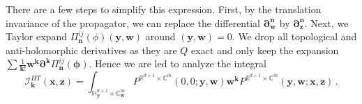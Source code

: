 \documentclass[11pt]{article}
\newcommand{\C}{\mathbb{C}}
\newcommand{\R}{\mathbb{R}}
\numberwithin{equation}{section}
\begin{document}
There are a few steps to simplify this expression. First, by the translation invariance of the propagator, we can replace the differential $\boldsymbol{\partial}^{\boldsymbol{n}}_{\boldsymbol{w}}$ by $\boldsymbol{\partial}^{\boldsymbol{n}}_{\boldsymbol{z}}$. Next, we Taylor expand $\Pi^{ij}_{\boldsymbol{n}}(\phi)(\boldsymbol{y},\boldsymbol{w})$ around $(\boldsymbol{y},\boldsymbol{w})= 0$. We drop all topological and anti-holomorphic derivatives as they are $Q$ exact and only keep the expansion $\sum\frac{1}{\boldsymbol{k}!}\boldsymbol{w}^{\boldsymbol{k}}\boldsymbol{\partial}^{\boldsymbol{k}}\Pi^{ij}_{\boldsymbol{n}}(\boldsymbol{\phi})$. Hence we are led to analyze the integral
 \begin{equation}
 \mathcal{I}^{HT}_{\boldsymbol{k}}(\boldsymbol{x},\boldsymbol{z}) = \int_{ \mathbb{H}^{d+1}_{\boldsymbol{y}}\times \C^m_{\boldsymbol{w}}} P^{\R^{d+1}\times \C^{m}}\!(0,0;\boldsymbol{y},\boldsymbol{w})\boldsymbol{w}^{\boldsymbol{k}}P^{\R^{d+1}\times \C^{m}}\!(\boldsymbol{y},\boldsymbol{w};\boldsymbol{x},\boldsymbol{z})\,.
 \end{equation}
 
\end{document}
